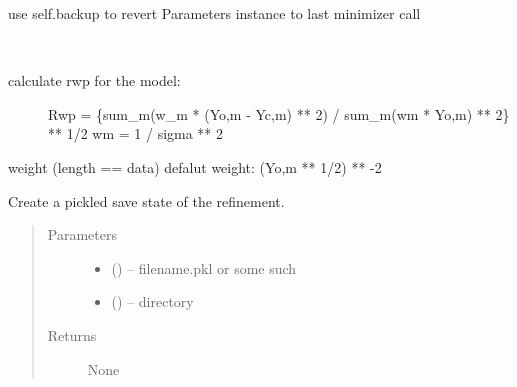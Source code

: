 \documentclass[letterpaper,10pt,english]{sphinxmanual}
\begin{document}
\begin{fulllineitems}
\begin{fulllineitems}
\end{fulllineitems}


\begin{fulllineitems}
\label{\detokenize{rst/refinement:mstack.refinement.Refinement.revert}}
use self.backup to revert Parameters instance to last minimizer call

\end{fulllineitems}


\begin{fulllineitems}
\label{\detokenize{rst/refinement:mstack.refinement.Refinement.rwp}}~\begin{description}
\item[{calculate rwp for the model:}] \leavevmode
Rwp = \{sum\_m(w\_m * (Yo,m - Yc,m) ** 2) / sum\_m(wm * Yo,m) ** 2\} ** 1/2
wm = 1 / sigma ** 2

\end{description}

weight (length == data)
defalut weight: (Yo,m ** 1/2) ** -2

\end{fulllineitems}


\begin{fulllineitems}
\label{\detokenize{rst/refinement:mstack.refinement.Refinement.save}}
Create a pickled save state of the refinement.
\begin{quote}\begin{description}
\item[{Parameters}] \leavevmode\begin{itemize}
\item {} 
 () -- filename.pkl or some such

\item {} 
 () -- directory

\end{itemize}

\item[{Returns}] \leavevmode
None


\end{description}
\end{quote}
\end{fulllineitems}
\end{fulllineitems}
\end{document}
